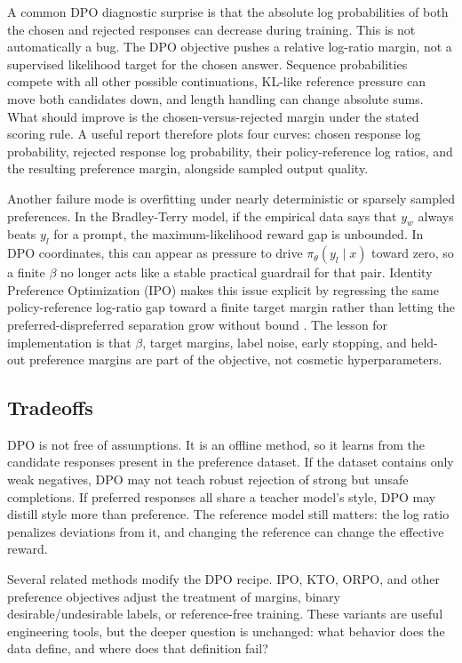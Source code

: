 A common DPO diagnostic surprise is that the absolute log probabilities of both the chosen and rejected responses can decrease during training. This is not automatically a bug. The DPO objective pushes a relative log-ratio margin, not a supervised likelihood target for the chosen answer. Sequence probabilities compete with all other possible continuations, KL-like reference pressure can move both candidates down, and length handling can change absolute sums. What should improve is the chosen-versus-rejected margin under the stated scoring rule. A useful report therefore plots four curves: chosen response log probability, rejected response log probability, their policy-reference log ratios, and the resulting preference margin, alongside sampled output quality.

Another failure mode is overfitting under nearly deterministic or sparsely sampled preferences. In the Bradley-Terry model, if the empirical data says that $y_w$ always beats $y_l$ for a prompt, the maximum-likelihood reward gap is unbounded. In DPO coordinates, this can appear as pressure to drive $\pi_\theta(y_l\mid x)$ toward zero, so a finite $\beta$ no longer acts like a stable practical guardrail for that pair. Identity Preference Optimization (IPO) makes this issue explicit by regressing the same policy-reference log-ratio gap toward a finite target margin rather than letting the preferred-dispreferred separation grow without bound \cite{azar2024general}. The lesson for implementation is that $\beta$, target margins, label noise, early stopping, and held-out preference margins are part of the objective, not cosmetic hyperparameters.

\subsection{Tradeoffs}
DPO is not free of assumptions. It is an offline method, so it learns from the candidate responses present in the preference dataset. If the dataset contains only weak negatives, DPO may not teach robust rejection of strong but unsafe completions. If preferred responses all share a teacher model's style, DPO may distill style more than preference. The reference model still matters: the log ratio penalizes deviations from it, and changing the reference can change the effective reward.

Several related methods modify the DPO recipe. IPO, KTO, ORPO, and other preference objectives adjust the treatment of margins, binary desirable/undesirable labels, or reference-free training. These variants are useful engineering tools, but the deeper question is unchanged: what behavior does the data define, and where does that definition fail?

